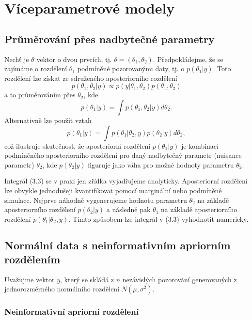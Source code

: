 \chapter{Víceparametrové modely}

\section{Průměrování přes nadbytečné parametry}

Nechť je $\theta$ vektor o dvou prvcích, tj. $\theta = (\theta_1, \theta_2)$. Předpokládejme, že se zajímáme o rozdělení $\theta_1$ podmíněné pozorovanými daty, tj. o $p(\theta_1 | y)$. Toto rozdělení lze získat ze sdruženého aposteriorního rozdělení
\begin{equation}
p(\theta_1, \theta_2 | y) \varpropto p(y | \theta_1, \theta_2) p(\theta_1, \theta_2)
\end{equation}
a to průměrováním přes $\theta_2$, kde
\begin{equation}
p(\theta_1 | y) = \int p(\theta_1, \theta_2 | y)d \theta_2.
\end{equation}
Alternativně lze použít vztah
\begin{equation}
p(\theta_1 | y) = \int p(\theta_1 | \theta_2, y)p(\theta_2 | y) d \theta_2,
\end{equation}
což ilustruje skutečnost, že aposteriorní rozdělení $p(\theta_1 | y)$ je kombinací podmíněného aposteriorního rozdělení pro daný nadbytečný parametr (nuisance parametr) $\theta_2$, kde $p(\theta_2 | y)$ figuruje jako váha pro možné hodnoty parametru $\theta_2$.

Integrál (3.3) se v praxi jen zřídka vyjadřujeme analyticky. Aposteriorní rozdělení lze obvykle jednodušeji kvantifikovat pomocí marginální nebo podmíněné simulace. Nejprve náhodně vygenerujeme hodnotu parametru $\theta_2$ na základě aposteriorního rozdělení $p(\theta_2 | y)$ a následně pak $\theta_1$ na základě aposteriorního rozdělení $p(\theta_1 | \theta_2, y)$. Tímto způsobem lze integrál v (3.3) vyhodnotit numericky.

\section{Normální data s neinformativním apriorním rozdělením}

Uvažujme vektor $y$, který se skládá z $n$ nezávislých pozorování generovaných z jednorozměrného normálního rozdělení $N(\mu, \sigma^2)$.

\subsection{Neinformativní apriorní rozdělení}

